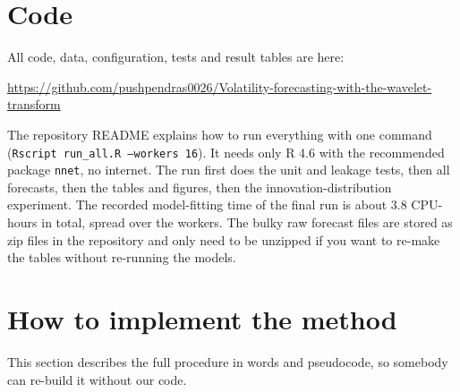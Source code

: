 \documentclass{article}
\begin{document}

\printAffiliationsAndNotice{}

\section{Code}

All code, data, configuration, tests and result tables are here:

\begin{center}
\url{https://github.com/pushpendras0026/Volatility-forecasting-with-the-wavelet-transform}
\end{center}

The repository README explains how to run everything with one command (\texttt{Rscript run\_all.R --workers 16}). It needs only R 4.6 with the recommended package \texttt{nnet}, no internet. The run first does the unit and leakage tests, then all forecasts, then the tables and figures, then the innovation-distribution experiment. The recorded model-fitting time of the final run is about 3.8 CPU-hours in total, spread over the workers. The bulky raw forecast files are stored as zip files in the repository and only need to be unzipped if you want to re-make the tables without re-running the models.

\section{How to implement the method}

This section describes the full procedure in words and pseudocode, so somebody can re-build it without our code.
\end{document}
